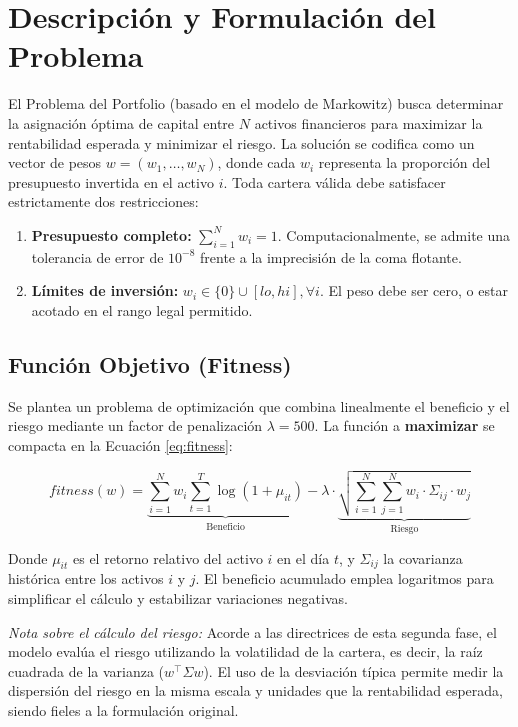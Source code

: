 \section{Descripción y Formulación del Problema}
\label{sec:formulacion}

El Problema del Portfolio (basado en el modelo de Markowitz) busca determinar la asignación óptima de capital entre $N$ activos financieros para maximizar la rentabilidad esperada y minimizar el riesgo. La solución se codifica como un vector de pesos $w = (w_1, \dots, w_N)$, donde cada $w_i$ representa la proporción del presupuesto invertida en el activo $i$. Toda cartera válida debe satisfacer estrictamente dos restricciones:
\begin{enumerate}[noitemsep]
    \item \textbf{Presupuesto completo:} $\sum_{i=1}^{N} w_i = 1$. Computacionalmente, se admite una tolerancia de error de $10^{-8}$ frente a la imprecisión de la coma flotante.
    \item \textbf{Límites de inversión:} $w_i \in \{0\} \cup [lo, hi], \forall i$. El peso debe ser cero, o estar acotado en el rango legal permitido.
\end{enumerate}

\subsection{Función Objetivo (Fitness)}
Se plantea un problema de optimización que combina linealmente el beneficio y el riesgo mediante un factor de penalización $\lambda = 500$. La función a \textbf{maximizar} se compacta en la Ecuación \ref{eq:fitness}:

\begin{equation}
    fitness(w) = \underbrace{\sum_{i=1}^{N} w_i \sum_{t=1}^{T} \log(1+\mu_{it})}_{\text{Beneficio}} - \lambda \cdot \underbrace{\sqrt{\sum_{i=1}^{N} \sum_{j=1}^{N} w_i \cdot \Sigma_{ij} \cdot w_j}}_{\text{Riesgo}}
    \label{eq:fitness}
\end{equation}

Donde $\mu_{it}$ es el retorno relativo del activo $i$ en el día $t$, y $\Sigma_{ij}$ la covarianza histórica entre los activos $i$ y $j$. El beneficio acumulado emplea logaritmos para simplificar el cálculo y estabilizar variaciones negativas.

\textit{Nota sobre el cálculo del riesgo:} Acorde a las directrices de esta segunda fase, el modelo evalúa el riesgo utilizando la volatilidad de la cartera, es decir, la raíz cuadrada de la varianza ($w^\top \Sigma w$). El uso de la desviación típica permite medir la dispersión del riesgo en la misma escala y unidades que la rentabilidad esperada, siendo fieles a la formulación original.

